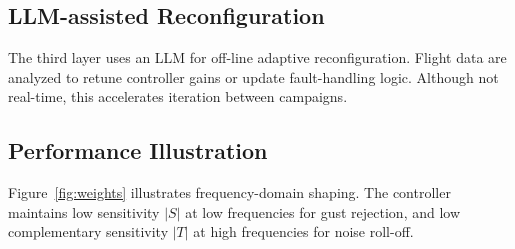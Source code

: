\documentclass[conference]{IEEEtran}
\begin{document}
\subsection{LLM-assisted Reconfiguration}
The third layer uses an LLM for off-line adaptive reconfiguration. Flight data are analyzed to retune controller gains or update fault-handling logic. Although not real-time, this accelerates iteration between campaigns.  

\subsection{Performance Illustration}
Figure~\ref{fig:weights} illustrates frequency-domain shaping. The controller maintains low sensitivity $|S|$ at low frequencies for gust rejection, and low complementary sensitivity $|T|$ at high frequencies for noise roll-off. 
\end{document}
